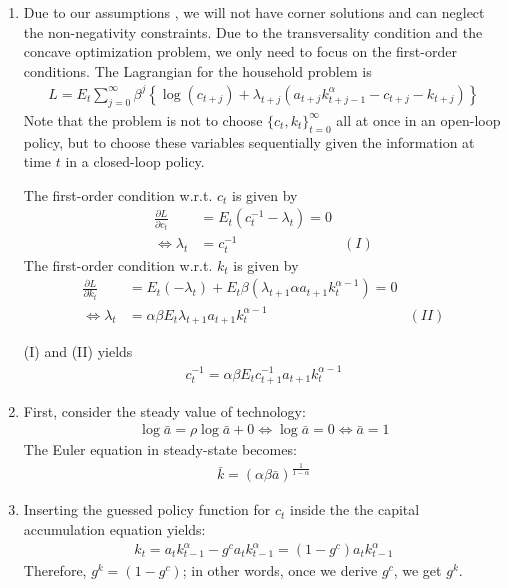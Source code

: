 \begin{enumerate}

\item Due to our assumptions , we will not have corner solutions and can neglect the non-negativity constraints.
Due to the transversality condition and the concave optimization problem, we only need to focus on the first-order conditions. 
The Lagrangian for the household problem is
\begin{align*}
L = E_t\sum_{j=0}^{\infty}\beta^j\left\{\log(c_{t+j}) + \lambda_{t+j} \left(a_{t+j}k_{t+j-1}^\alpha - c_{t+j} - k_{t+j}\right)\right\}
\end{align*}
Note that the problem is not to choose $\{c_t,k_{t}\}_{t=0}^\infty$ all at once in an open-loop policy,
  but to choose these variables sequentially given the information at time $t$ in a closed-loop policy.

The first-order condition w.r.t. $c_t$ is given by
\begin{align*}
\frac{\partial L}{\partial c_{t}} &= E_t \left(c_t^{-1}-\lambda_{t}\right) = 0
\\
\Leftrightarrow \lambda_{t} &= c_{t}^{-1} & (I)
\end{align*}
The first-order condition w.r.t. $k_{t}$ is given by
\begin{align*}
\frac{\partial L}{\partial k_{t}} &= E_t (-\lambda_{t}) + E_t \beta \left(\lambda_{t+1}\alpha a_{t+1} k_{t}^{\alpha-1}\right) = 0
\\
\Leftrightarrow \lambda_{t} &= \alpha\beta E_t \lambda_{t+1} a_{t+1} k_{t}^{\alpha-1} & (II)
\end{align*}
			
(I) and (II) yields
\begin{align*}
c_t^{-1} = \alpha \beta E_t c_{t+1}^{-1} a_{t+1} k_{t}^{\alpha-1}
\end{align*}
	
\item First, consider the steady value of technology: 
\begin{align*}
\log\bar{a}=\rho \log\bar{a} + 0 \Leftrightarrow \log\bar{a} = 0 \Leftrightarrow \bar{a} = 1
\end{align*}
The Euler equation in steady-state becomes:
\begin{align*}
\bar{k} = (\alpha \beta \bar{a})^{\frac{1}{1-\alpha}}
\end{align*}
	
\item Inserting the guessed policy function for $c_t$ inside the the capital accumulation equation yields:
\begin{align*}
k_{t} = a_{t} k_{t-1}^\alpha - g^c a_t k_{t-1}^\alpha = (1-g^c) a_t k_{t-1}^\alpha
\end{align*}
Therefore, $g^k=(1-g^c)$; in other words, once we derive $g^c$, we get $g^k$.
			

\end{enumerate}
